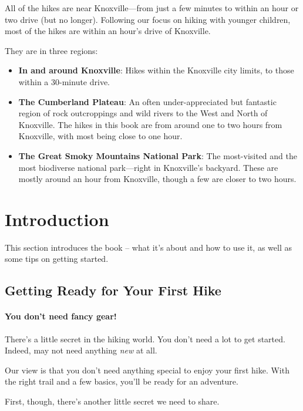 \documentclass[
  letterpaper,
  DIV=11,
  numbers=noendperiod]{scrreprt}
\providecommand{\tightlist}{%
  \setlength{\itemsep}{0pt}\setlength{\parskip}{0pt}}\usepackage{longtable,booktabs,array}
\begin{document}
All of the hikes are near Knoxville---from just a few minutes to within
an hour or two drive (but no longer). Following our focus on hiking with
younger children, most of the hikes are within an hour's drive of
Knoxville.

They are in three regions:

\begin{itemize}
\tightlist
\item
  \textbf{In and around Knoxville}: Hikes within the Knoxville city
  limits, to those within a 30-minute drive.
\item
  \textbf{The Cumberland Plateau}: An often under-appreciated but
  fantastic region of rock outcroppings and wild rivers to the West and
  North of Knoxville. The hikes in this book are from around one to two
  hours from Knoxville, with most being close to one hour.
\item
  \textbf{The Great Smoky Mountains National Park}: The most-visited and
  the most biodiverse national park---right in Knoxville's backyard.
  These are mostly around an hour from Knoxville, though a few are
  closer to two hours.
\end{itemize}

\part{Introduction}

This section introduces the book -- what it's about and how to use it,
as well as some tips on getting started.

\chapter{Getting Ready for Your First
Hike}\label{getting-ready-for-your-first-hike}

\subsection{You don't need fancy gear!}\label{you-dont-need-fancy-gear}

There's a little secret in the hiking world. You don't need a lot to get
started. Indeed, may not need anything \emph{new} at all.

Our view is that you don't need anything special to enjoy your first
hike. With the right trail and a few basics, you'll be ready for an
adventure.

First, though, there's another little secret we need to share.
\end{document}
